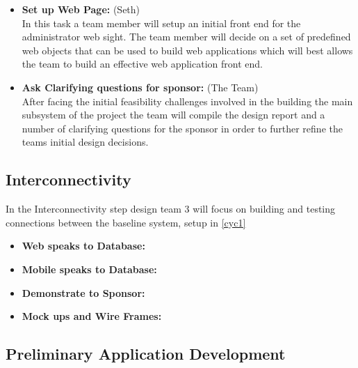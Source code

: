 \documentclass[Letter,11pt]{article}
\begin{document}
\begin{itemize}
			\item\textbf{Set up Web Page:} (Seth)\\
			In this task a team member will setup an initial front end for the administrator web sight. The team member will decide on a set of predefined web objects that can be used to build web applications which will best allows the team to build an effective web application front end. 
			
			\item\textbf{Ask Clarifying questions for sponsor:} (The Team)\\
			After facing the initial feasibility challenges involved in the building the main subsystem of the project the team will compile the design report and a number of clarifying questions for the sponsor in order to further refine the teams initial design decisions. 
		\end{itemize}
		
		
		
	\subsection{Interconnectivity}\label{connect}
		In the Interconnectivity step design team 3 will focus on building and testing connections between the baseline system, setup in \ref{cyc1}
		\begin{itemize}
			\item\textbf{Web speaks to Database:}\\
			
			
			\item \textbf{Mobile speaks to Database:}\\
			
			\item\textbf{Demonstrate to Sponsor:}\\
			
			\item\textbf{Mock ups and Wire Frames:}\\
			
		\end{itemize}
		
		\subsection{Preliminary Application Development}\label{dev1}
		
\end{document}
